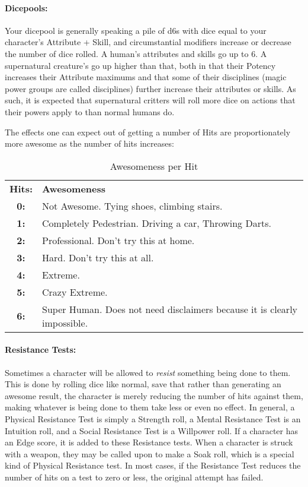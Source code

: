 \paragraph{Dicepools:} Your dicepool is generally speaking a pile of d6s with dice equal to your character's Attribute + Skill, and circumstantial modifiers increase or decrease the number of dice rolled. A human's attributes and skills go up to 6. A supernatural creature's go up higher than that, both in that their Potency increases their Attribute maximums and that some of their disciplines (magic power groups are called disciplines) further increase their attributes or skills. As such, it is expected that supernatural critters will roll more dice on actions that their powers apply to than normal humans do.

The effects one can expect out of getting a number of Hits are proportionately more awesome as the number of hits increases:

\begin{table}[htb]  \center
\caption[Awesomeness per Hit (Running the Game)]{Awesomeness per Hit} \hspace{3cm}
\begin{tabular}{c l}
\textbf{Hits:} & \textbf{Awesomeness} \\
\textbf{0:} & Not Awesome. Tying shoes, climbing stairs.\\
\textbf{1:} & Completely Pedestrian. Driving a car, Throwing Darts.\\
\textbf{2:} & Professional. Don't try this at home.\\
\textbf{3:} & Hard. Don't try this at all.\\
\textbf{4:} & Extreme.\\
\textbf{5:} & Crazy Extreme.\\
\textbf{6:} & Super Human. Does not need disclaimers because it is clearly impossible. \\
\end{tabular}
\end{table}

\paragraph{Resistance Tests:} Sometimes a character will be allowed to \textit{resist} something being done to them. This is done by rolling dice like normal, save that rather than generating an awesome result, the character is merely reducing the number of hits against them, making whatever is being done to them take less or even no effect. In general, a Physical Resistance Test is simply a Strength roll, a Mental Resistance Test is an Intuition roll, and a Social Resistance Test is a Willpower roll. If a character has an Edge score, it is added to these Resistance tests. When a character is struck with a weapon, they may be called upon to make a Soak roll, which is a special kind of Physical Resistance test. In most cases, if the Resistance Test reduces the number of hits on a test to zero or less, the original attempt has failed.

